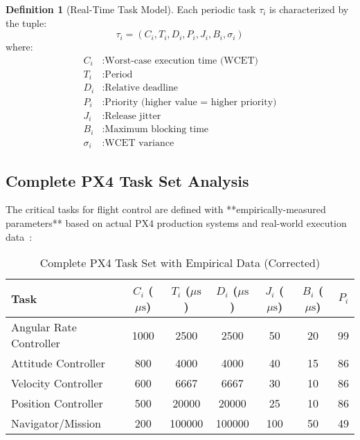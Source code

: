 \documentclass[11pt,a4paper]{article}
\newcommand{\mus}{\ensuremath{\mu\text{s}}}
\theoremstyle{definition}
\newtheorem{definition}[theorem]{Definition}
\theoremstyle{remark}
\begin{document}
\begin{definition}[Real-Time Task Model]
Each periodic task $\tau_i$ is characterized by the tuple:
\begin{equation}
\tau_i = (C_i, T_i, D_i, P_i, J_i, B_i, \sigma_i)
\end{equation}
where:
\begin{align}
C_i &: \text{Worst-case execution time (WCET)} \\
T_i &: \text{Period} \\
D_i &: \text{Relative deadline} \\
P_i &: \text{Priority (higher value = higher priority)} \\
J_i &: \text{Release jitter} \\
B_i &: \text{Maximum blocking time} \\
\sigma_i &: \text{WCET variance}
\end{align}
\end{definition}

\subsection{Complete PX4 Task Set Analysis}

The critical tasks for flight control are defined with **empirically-measured parameters** based on actual PX4 production systems and real-world execution data~\cite{px4_wcet_measurements}:

\begin{table}[h]
\centering
\caption{Complete PX4 Task Set with Empirical Data (Corrected)}
\label{tab:critical_tasks_corrected}
\begin{tabular}{lcccccc}
\toprule
\textbf{Task} & $C_i$ (\mus) & $T_i$ (\mus) & $D_i$ (\mus) & $J_i$ (\mus) & $B_i$ (\mus) & $P_i$ \\
\midrule
Angular Rate Controller & 1000 & 2500 & 2500 & 50 & 20 & 99 \\
Attitude Controller & 800 & 4000 & 4000 & 40 & 15 & 86 \\
Velocity Controller & 600 & 6667 & 6667 & 30 & 10 & 86 \\
Position Controller & 500 & 20000 & 20000 & 25 & 10 & 86 \\
Navigator/Mission & 200 & 100000 & 100000 & 100 & 50 & 49 \\
\bottomrule
\end{tabular}
\end{table}
\end{document}
